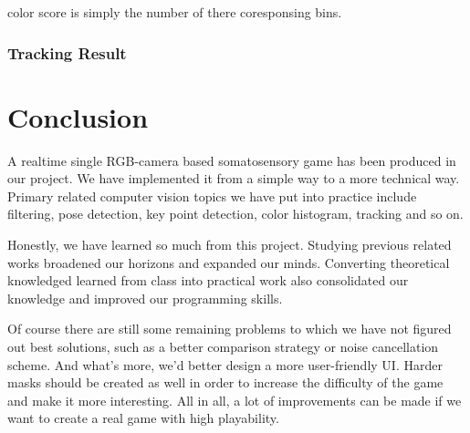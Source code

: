\documentclass[11pt,twocolumn,letterpaper]{article}
\begin{document}
\par
color score is simply the number of there coresponsing bins.

\subsubsection{Tracking Result}
\section{Conclusion}
    \par A realtime single RGB-camera based somatosensory game has been produced in our project. We have implemented it from a simple way to a more technical way. Primary related computer vision topics we have put into practice include filtering, pose detection, key point detection, color histogram, tracking and so on.
    \par Honestly, we have learned so much from this project. Studying previous related works broadened our horizons and expanded our minds. Converting theoretical knowledged learned from class into practical work also consolidated our knowledge and improved our programming skills.
    \par Of course there are still some remaining problems to which we have not figured out best solutions, such as a better comparison strategy or noise cancellation scheme. And what's more, we'd better design a more user-friendly UI. Harder masks should be created as well in order to increase the difficulty of the game and make it more interesting. All in all, a lot of improvements can be made if we want to create a real game with high playability.

{\small


}
\end{document}
